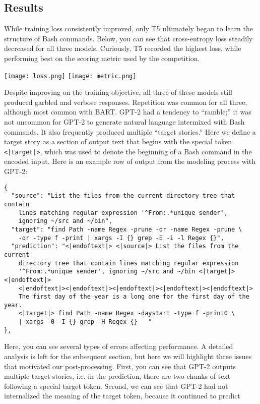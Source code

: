 \documentclass{article}
\begin{document}
\subsection{Results}
While training loss consistently improved, only T5 ultimately began to
learn the structure of Bash commands. Below, you can see that cross-entropy
loss steadily decreased for all three models. Curiously, T5 recorded the highest
loss, while performing best on the scoring metric used by the competition.
\begin{center}
	\texttt{[image: loss.png]}
	\texttt{[image: metric.png]}
\end{center}
Despite improving on the training objective, all three of these models still
produced garbled and verbose responses. Repetition was common for all three,
although most common with BART. GPT-2 had a tendency to ``ramble;'' it was not uncommon
for GPT-2 to generate natural language intermixed with Bash commands. It also
frequently produced multiple ``target stories.'' Here we define a target story
as a section of output text that begins with the special token
\texttt{<|target|>}, which was used to denote the beginning of a Bash command
in the encoded input. Here is an example row of output from the modeling process with GPT-2:
\begin{verbatim}
{
  "source": "List the files from the current directory tree that contain
    lines matching regular expression '^From:.*unique sender',
    ignoring ~/src and ~/bin",
  "target": "find Path -name Regex -prune -or -name Regex -prune \
    -or -type f -print | xargs -I {} grep -E -i -l Regex {}",
  "prediction": "<|endoftext|> <|source|> List the files from the current
    directory tree that contain lines matching regular expression
    '^From:.*unique sender', ignoring ~/src and ~/bin <|target|><|endoftext|>
    <|endoftext|><|endoftext|><|endoftext|><|endoftext|><|endoftext|>
    The first day of the year is a long one for the first day of the year.
    <|target|> find Path -name Regex -daystart -type f -print0 \
    | xargs -0 -I {} grep -H Regex {}   "
},
\end{verbatim}
Here, you can see several types of errors affecting performance. A detailed
analysis is left for the subsequent section, but here we will highlight three
issues that motivated our post-processing. First, you can see that GPT-2 outputs
multiple target stories, i.e. in the prediction, there are two chunks of text
following a special target token. Second, we can see that GPT-2 had
not internalized the meaning of the target token, because it continued to predict
\end{document}
